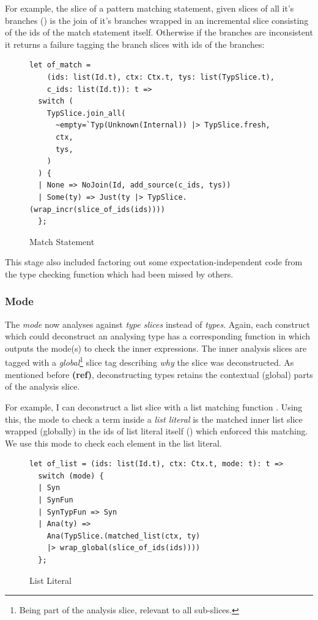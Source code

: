 For example, the slice of a pattern matching statement, given slices of all it's branches () is the join of it's branches wrapped in an incremental slice consisting of the ids of the match statement itself. Otherwise if the branches are inconsistent it returns a failure tagging the branch slices with ids of the branches:
\begin{figure}[h]
\begin{verbatim}
let of_match =
    (ids: list(Id.t), ctx: Ctx.t, tys: list(TypSlice.t), 
    c_ids: list(Id.t)): t =>
  switch (
    TypSlice.join_all(
      ~empty=`Typ(Unknown(Internal)) |> TypSlice.fresh,
      ctx,
      tys,
    )
  ) {
  | None => NoJoin(Id, add_source(c_ids, tys))
  | Some(ty) => Just(ty |> TypSlice.(wrap_incr(slice_of_ids(ids))))
  };
\end{verbatim}
\caption{Match Statement }
\end{figure}

This stage also included factoring out some expectation-independent code from the type checking function which had been missed by others.

\subsubsection{Mode}
The \textit{mode} now analyses against \textit{type slices} instead of \textit{types}. Again, each construct which could deconstruct an analysing type has a corresponding function in  which outputs the mode(s) to check the inner expressions. The inner analysis slices are tagged with a \textit{global}\footnote{Being part of the analysis slice, relevant to all sub-slices.} slice tag describing \textit{why} the slice was deconstructed. As mentioned before \textbf{(ref)}, deconstructing types retains the contextual (global) parts of the analysis slice.

For example, I can deconstruct a list slice with a list matching function . Using this, the mode to check a term inside a \textit{list literal} is the matched inner list slice wrapped (globally) in the ids of list literal itself () which enforced this matching. We use this mode to check each element in the list literal.

\begin{figure}
\begin{verbatim}
let of_list = (ids: list(Id.t), ctx: Ctx.t, mode: t): t =>
  switch (mode) {
  | Syn
  | SynFun
  | SynTypFun => Syn
  | Ana(ty) =>
    Ana(TypSlice.(matched_list(ctx, ty) 
    |> wrap_global(slice_of_ids(ids))))
  };
\end{verbatim}
\caption{List Literal }
\end{figure}

